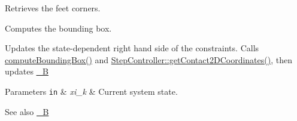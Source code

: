 \begin{DoxyItemize}
\item \-Retrieves the feet corners.
\item \-Computes the bounding box.
\item \-Updates the state-\/dependent right hand side of the constraints. \-Calls \hyperlink{classBaseOfSupport_a8ab32cc933754f6307c7d749189adbfe}{compute\-Bounding\-Box()} and \hyperlink{classStepController_afb77002292921660ef4a44657d6566f1}{\-Step\-Controller\-::get\-Contact2\-D\-Coordinates()}, then updates \hyperlink{classBaseOfSupport_adfa70199064a50d9d7aea9a6d4b13246}{\-\_\-\-B}
\end{DoxyItemize}


\begin{DoxyParams}[1]{\-Parameters}
\mbox{\tt in}  & {\em xi\-\_\-k} & \-Current system state.\\
\hline
\end{DoxyParams}
\begin{DoxySeeAlso}{\-See also}
\hyperlink{classBaseOfSupport_adfa70199064a50d9d7aea9a6d4b13246}{\-\_\-\-B} 
\end{DoxySeeAlso}



